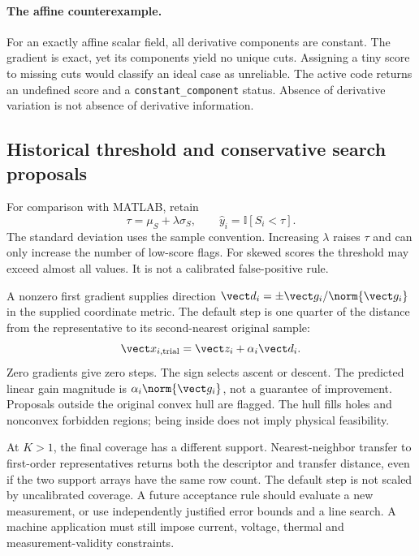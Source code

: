 \paragraph{The affine counterexample.}
For an exactly affine scalar field, all derivative components are constant.
The gradient is exact, yet its components yield no unique cuts. Assigning a
tiny score to missing cuts would classify an ideal case as unreliable.
The active code returns an undefined score and a
\texttt{constant\_component} status. Absence of derivative variation is not
absence of derivative information.

\subsection{Historical threshold and conservative search proposals}
For comparison with MATLAB, retain
\begin{equation}
 \tau=\mu_S+\lambda\sigma_S,\qquad
 \widehat y_i=\mathbb I[S_i<\tau].
 \label{eq:threshold}
\end{equation}
The standard deviation uses the sample convention. Increasing $\lambda$
raises $\tau$ and can only increase the number of low-score flags.
For skewed scores the threshold may exceed almost all values.
It is not a calibrated false-positive rule.

A nonzero first gradient supplies direction
$\vect d_i=\pm\vect g_i/\norm{\vect g_i}$ in the supplied coordinate metric.
The default step is one quarter of the distance from the representative to
its second-nearest original sample:
\begin{equation}
 \vect x_{i,\mathrm{trial}}=\vect z_i+\alpha_i\vect d_i.
 \label{eq:proposal}
\end{equation}
Zero gradients give zero steps. The sign selects ascent or descent.
The predicted linear gain magnitude is $\alpha_i\norm{\vect g_i}$, not a
guarantee of improvement. Proposals outside the original convex hull are
flagged. The hull fills holes and nonconvex forbidden regions; being inside
does not imply physical feasibility.

At $K>1$, the final coverage has a different support. Nearest-neighbor
transfer to first-order representatives returns both the descriptor and
transfer distance, even if the two support arrays have the same row count.
The default step is not scaled by uncalibrated coverage. A future acceptance
rule should evaluate a new measurement, or use independently justified error
bounds and a line search. A machine application must still impose current,
voltage, thermal and measurement-validity constraints.
